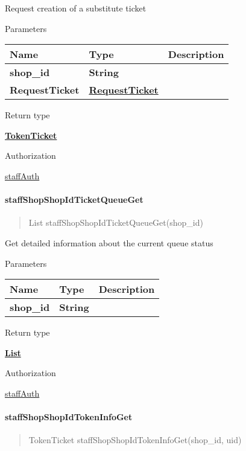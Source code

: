 Request creation of a substitute ticket

Parameters

\begin{longtable}[]{@{}lll@{}}
\toprule
Name & Type & Description\tabularnewline
\midrule
\endhead
\textbf{shop\_id} & \textbf{String} &\tabularnewline
\textbf{RequestTicket} &
\href{../Models/RequestTicket.md}{\textbf{RequestTicket}}
&\tabularnewline
\bottomrule
\end{longtable}

Return type

\href{../Models/TokenTicket.md}{\textbf{TokenTicket}}

Authorization

\href{../README.md\#staffAuth}{staffAuth}

\hypertarget{staffshopshopidticketqueueget}{%
\paragraph{\texorpdfstring{\textbf{staffShopShopIdTicketQueueGet}}{staffShopShopIdTicketQueueGet}}\label{staffshopshopidticketqueueget}}

\begin{quote}
List staffShopShopIdTicketQueueGet(shop\_id)
\end{quote}

Get detailed information about the current queue status

Parameters

\begin{longtable}[]{@{}lll@{}}
\toprule
Name & Type & Description\tabularnewline
\midrule
\endhead
\textbf{shop\_id} & \textbf{String} &\tabularnewline
\bottomrule
\end{longtable}

Return type

\href{../Models/TokenTicket.md}{\textbf{List}}

Authorization

\href{../README.md\#staffAuth}{staffAuth}

\hypertarget{staffshopshopidtokeninfoget}{%
\paragraph{\texorpdfstring{\textbf{staffShopShopIdTokenInfoGet}}{staffShopShopIdTokenInfoGet}}\label{staffshopshopidtokeninfoget}}

\begin{quote}
TokenTicket staffShopShopIdTokenInfoGet(shop\_id, uid)
\end{quote}

